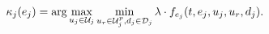 \begin{equation}
\label{eq:robust_tracking_law}
\tracklaw_j(e_j) = \arg\max_{\ctrl_j \in \cset_j} \min_{\ctrl_r \in\cset^\pos_j, \dstb_j \in \dset_j} \costate \cdot \fdyn_{e_j}(t,e_j,\ctrl_j,\ctrl_r,\dstb_j).
\end{equation}

%
%
%

